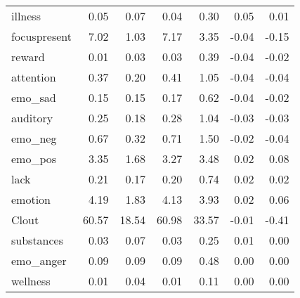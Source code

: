 \begin{longtable}{@{}p{3.4cm}rrrrrr@{}}
illness & 0.05 & 0.07 & 0.04 & 0.30 & 0.05 & 0.01 \\
focuspresent & 7.02 & 1.03 & 7.17 & 3.35 & -0.04 & -0.15 \\
reward & 0.01 & 0.03 & 0.03 & 0.39 & -0.04 & -0.02 \\
attention & 0.37 & 0.20 & 0.41 & 1.05 & -0.04 & -0.04 \\
emo\_sad & 0.15 & 0.15 & 0.17 & 0.62 & -0.04 & -0.02 \\
auditory & 0.25 & 0.18 & 0.28 & 1.04 & -0.03 & -0.03 \\
emo\_neg & 0.67 & 0.32 & 0.71 & 1.50 & -0.02 & -0.04 \\
emo\_pos & 3.35 & 1.68 & 3.27 & 3.48 & 0.02 & 0.08 \\
lack & 0.21 & 0.17 & 0.20 & 0.74 & 0.02 & 0.02 \\
emotion & 4.19 & 1.83 & 4.13 & 3.93 & 0.02 & 0.06 \\
Clout & 60.57 & 18.54 & 60.98 & 33.57 & -0.01 & -0.41 \\
substances & 0.03 & 0.07 & 0.03 & 0.25 & 0.01 & 0.00 \\
emo\_anger & 0.09 & 0.09 & 0.09 & 0.48 & 0.00 & 0.00 \\
wellness & 0.01 & 0.04 & 0.01 & 0.11 & 0.00 & 0.00 \\
\end{longtable}
\endgroup
